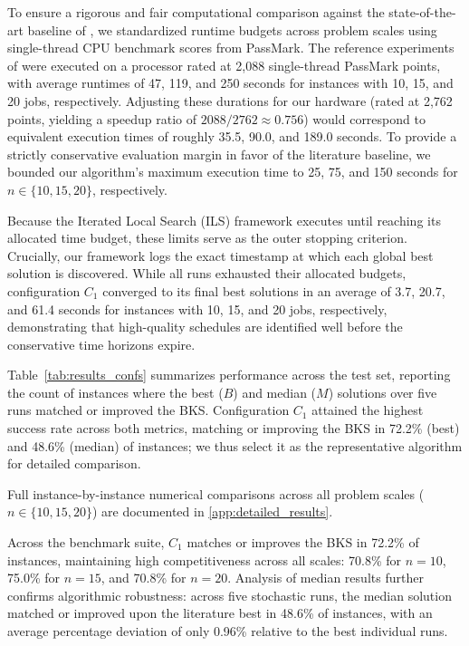 To ensure a rigorous and fair computational comparison against the state-of-the-art baseline of \citet{ahmadian2021meta}, we standardized runtime budgets across problem scales using single-thread CPU benchmark scores from PassMark.
The reference experiments of \citet{ahmadian2021meta} were executed on a processor rated at 2,088 single-thread PassMark points, with average runtimes of 47, 119, and 250 seconds for instances with 10, 15, and 20 jobs, respectively.
Adjusting these durations for our hardware (rated at 2,762 points, yielding a speedup ratio of $2088 / 2762 \approx 0.756$) would correspond to equivalent execution times of roughly 35.5, 90.0, and 189.0 seconds.
To provide a strictly conservative evaluation margin in favor of the literature baseline, we bounded our algorithm's maximum execution time to 25, 75, and 150 seconds for $n \in \{10, 15, 20\}$, respectively.

Because the Iterated Local Search (ILS) framework executes until reaching its allocated time budget, these limits serve as the outer stopping criterion.
Crucially, our framework logs the exact timestamp at which each global best solution is discovered.
While all runs exhausted their allocated budgets, configuration $C_1$ converged to its final best solutions in an average of 3.7, 20.7, and 61.4 seconds for instances with 10, 15, and 20 jobs, respectively, demonstrating that high-quality schedules are identified well before the conservative time horizons expire.


% 
%
% 
%
% 



Table~\ref{tab:results_confs} summarizes performance across the test set, reporting the count of instances where the best ($B$) and median ($M$) solutions over five runs matched or improved the BKS.
Configuration $C_1$ attained the highest success rate across both metrics, matching or improving the BKS in 72.2\% (best) and 48.6\% (median) of instances; we thus select it as the representative algorithm for detailed comparison.

Full instance-by-instance numerical comparisons across all problem scales ($n \in \{10, 15, 20\}$) are documented in \ref{app:detailed_results}.

Across the benchmark suite, $C_1$ matches or improves the BKS in 72.2\% of instances, maintaining high competitiveness across all scales: 70.8\% for $n=10$, 75.0\% for $n=15$, and 70.8\% for $n=20$.
Analysis of median results further confirms algorithmic robustness: across five stochastic runs, the median solution matched or improved upon the literature best in 48.6\% of instances, with an average percentage deviation of only 0.96\% relative to the best individual runs.

